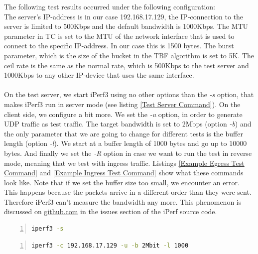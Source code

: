 The following test results occurred under the following configuration:
\\
The server's \acs{IP}-address is in our case 192.168.17.129, the \acs{IP}-connection to the server is limited to 500Kbps and the default bandwidth is 1000Kbps. The \ac{MTU} parameter in \acs{TC} is set to the \acs{MTU} of the network interface that is used to connect to the specific \acs{IP}-address. In our case this is 1500 bytes. The burst parameter, which is the size of the bucket in the \acs{TBF} algorithm is set to 5K. The ceil rate is the same as the normal rate, which is 500Kbps to the test server and 1000Kbps to any other \acs{IP}-device that uses the same interface.
\\
\\
On the test server, we start iPerf3 using no other options than the \textit{-s} option, that makes iPerf3 run in server mode (see listing \ref{Test Server Command}). On the client side, we configure a bit more. We set the \textit{-u} option, in order to generate \acs{UDP} traffic as test traffic. The target bandwidth is set to 2Mbps (option \textit{-b}) and the only parameter that we are going to change for different tests is the buffer length (option \textit{-l}). We start at a buffer length of 1000 bytes and go up to 10000 bytes. And finally we set the \textit{-R} option in case we want to run the test in reverse mode, meaning that we test with ingress traffic. Listings \ref{Example Egress Test Command} and \ref{Example Ingress Test Command} show what these commands look like. Note that if we set the buffer size too small, we encounter an error. This happens because the packets arrive in a different order than they were sent. Therefore iPerf3 can't measure the bandwidth any more. This phenomenon is discussed on \href{https://github.com/esnet/iperf/issues/457}{github.com}\cite{mah2016iperfIssue} in the issues section of the iPerf source code.

\begin{lstlisting}[language=sh, caption = Test Server Command, captionpos=b, numbers=left, frame=single, breaklines=true, breakatwhitespace=true, showstringspaces=false, label=Test Server Command]
iperf3 -s
\end{lstlisting}

\begin{lstlisting}[language=sh, caption = Example Egress Test Command, captionpos=b, numbers=left, frame=single, breaklines=true, breakatwhitespace=true, showstringspaces=false, label=Example Egress Test Command]
iperf3 -c 192.168.17.129 -u -b 2Mbit -l 1000
\end{lstlisting}

